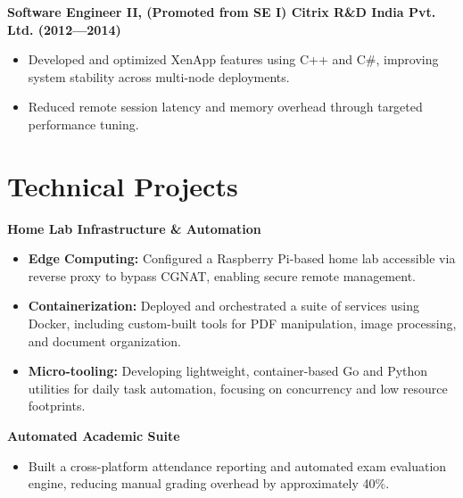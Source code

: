 \begin{innerlist}
\item
\textbf{Software Engineer II, (Promoted from SE I) Citrix R\&D India Pvt. Ltd. (2012—2014)}
\begin{itemize}
    \item Developed and optimized XenApp features using C++ and C\#, improving system stability across multi-node deployments.
    \item Reduced remote session latency and memory overhead through targeted performance tuning.
\end{itemize}
\end{innerlist}

\section{Technical Projects}

\textbf{Home Lab Infrastructure \& Automation}
\begin{innerlist}
\item
\begin{itemize}
    \item \textbf{Edge Computing:} Configured a Raspberry Pi-based home lab accessible via reverse proxy to bypass CGNAT, enabling secure remote management.
    \item \textbf{Containerization:} Deployed and orchestrated a suite of services using Docker, including custom-built tools for PDF manipulation, image processing, and document organization.
    \item \textbf{Micro-tooling:} Developing lightweight, container-based Go and Python utilities for daily task automation, focusing on concurrency and low resource footprints.
\end{itemize}

\item
\textbf{Automated Academic Suite}
\begin{itemize}
    \item Built a cross-platform attendance reporting and automated exam evaluation engine, reducing manual grading overhead by approximately 40\%.
\end{itemize}
\end{innerlist}